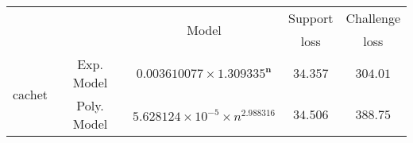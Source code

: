 \begin{tabular}{ccccc} 
\hline 
 &  & \multirow{2}{*}{Model} & Support & Challenge\tabularnewline 
 &  &  & loss  & loss\tabularnewline 
\hline 
\hline 
\multirow{2}{*}{cachet} & Exp. Model & $\mathbf{0.003610077\times 1.309335^{n}}$ & $\mathbf{34.357}$ & $\mathbf{304.01}$ \tabularnewline 
 & Poly. Model & $5.628124\times10^{-5}\times n^{2.988316}$ & $34.506$ & $388.75$ \tabularnewline 
\hline 
\end{tabular} 

